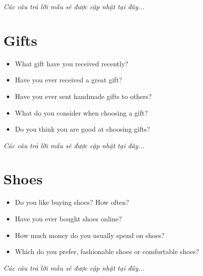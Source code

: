 \vspace{1em}
\textit{Các câu trả lời mẫu sẽ được cập nhật tại đây...}
\vspace{2em}

\section{Gifts}
\begin{ieltsprompt}
\begin{itemize}[itemsep=4pt]
    \item What gift have you received recently?
    \item Have you ever received a great gift?
    \item Have you ever sent handmade gifts to others?
    \item What do you consider when choosing a gift?
    \item Do you think you are good at choosing gifts?
\end{itemize}
\end{ieltsprompt}

\vspace{1em}
\textit{Các câu trả lời mẫu sẽ được cập nhật tại đây...}
\vspace{2em}

\section{Shoes}
\begin{ieltsprompt}
\begin{itemize}[itemsep=4pt]
    \item Do you like buying shoes? How often?
    \item Have you ever bought shoes online?
    \item How much money do you usually spend on shoes?
    \item Which do you prefer, fashionable shoes or comfortable shoes?
\end{itemize}
\end{ieltsprompt}

\vspace{1em}
\textit{Các câu trả lời mẫu sẽ được cập nhật tại đây...}
\vspace{2em}


